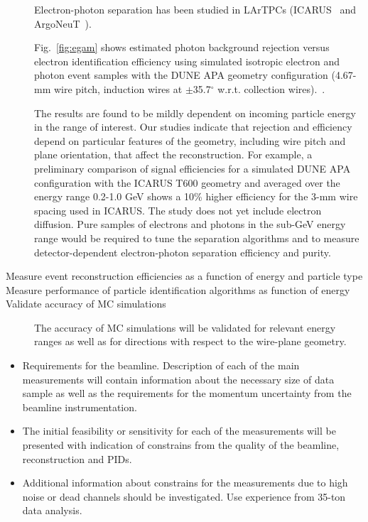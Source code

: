 \begin{description}
Electron-photon separation has been studied in LArTPCs (ICARUS~\cite{icarus_eg} and ArgoNeuT~\cite{argoneut_eg}).

Fig.~\ref{fig:egam}  shows estimated photon background rejection versus electron identification efficiency using 
simulated isotropic electron and photon event samples  with the DUNE APA geometry configuration (4.67-mm wire pitch, induction wires at $\pm$35.7$^{\circ}$ w.r.t. collection wires).~\cite{dunecdr}. 

The results are found to be mildly dependent on incoming particle energy in the range of interest. 
%
Our  studies indicate that rejection and efficiency depend 
on particular features of the geometry, including wire pitch and plane 
orientation, that affect the reconstruction. 
For example, a preliminary comparison of signal efficiencies for a simulated 
DUNE APA configuration with the ICARUS T600 geometry
and averaged over the energy range 0.2-1.0 GeV shows 
a 10\% higher efficiency for the 3-mm wire spacing used in ICARUS.
The study does not yet include electron diffusion.
%
Pure samples of electrons and photons in the sub-GeV energy range would be
required to tune the separation algorithms and to measure 
detector-dependent electron-photon separation efficiency and purity. 


\item [Measure event reconstruction efficiencies as a function of energy and particle type]
\item [Measure performance of particle identification algorithms as function of energy]
\item [Validate accuracy of MC simulations] The accuracy of MC simulations will be validated for relevant energy ranges as well as for 
directions with respect to the wire-plane geometry.
\end{description}

\begin{itemize}
\item Requirements for the beamline. Description of  each of the main measurements will contain  information about the necessary size of data sample as well as the requirements  for the momentum uncertainty from the beamline instrumentation. 
\item The initial feasibility or sensitivity  for each of the measurements will be presented with indication of constrains from the quality of the beamline, reconstruction and PIDs. 
\item Additional information about constrains for the measurements due to high noise or dead channels should be investigated. Use experience from 35-ton data analysis. 
\end{itemize}

